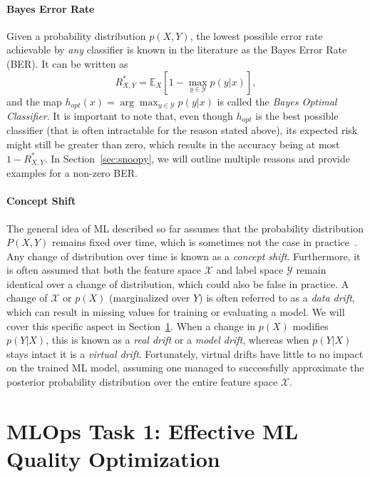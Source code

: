 \documentclass[11pt]{article}
\def \cX {\mathcal X}
\def \cY {\mathcal Y}
\begin{document}
\paragraph{Bayes Error Rate}
Given a probability distribution $p(X,Y)$, the lowest possible error rate achievable by \textit{any} classifier is known in the literature as the Bayes Error Rate (BER). It can be written as
\begin{equation}
\label{eq:bayes_error}
R_{X,Y}^* = \mathbb{E}_{X} \left[ 1- \max_{y\in\cY} p(y| x) \right],
\end{equation}
and the map $h_{opt}(x)=\arg \max_{y\in\cY} p(y \vert x)$ is called the \textit{Bayes Optimal Classifier}. It is important to note that, even though $h_{opt}$ is the best possible classifier (that is often intractable for the reason stated above), its expected risk might still be greater than zero, which results in the accuracy being at most $1 - R_{X,Y}^*$. In Section~\ref{sec:snoopy}, we will outline multiple reasons and provide examples for a non-zero BER.

\paragraph{Concept Shift}

The general idea of ML described so far assumes that the probability distribution $P(X, Y)$ remains fixed over time, which is sometimes not the case in practice~\cite{widmer1996learning, tsymbal2004problem, gama2014survey}. Any change of distribution over time is known as a \textit{concept shift}.
Furthermore, it is often assumed that both the feature space $\cX$ and label space $\cY$ remain identical over a change of distribution, which could also be false in practice. A change of $\cX$ or $p(X)$ (marginalized over $Y$) is often referred to as a \textit{data drift}, which can result in missing values for training or evaluating a model. We will cover this specific aspect in Section~\ref{sec:cpclean}. When a change in $p(X)$ modifies $p(Y\vert X)$, this is known as a \textit{real drift} or a \textit{model drift}, whereas when $p(Y\vert X)$ stays intact it is a \textit{virtual drift}. Fortunately, virtual drifts have little to no impact on the trained ML model, assuming one managed to successfully approximate the posterior probability distribution over the entire feature space $\cX$.

\section{MLOps Task 1: Effective ML Quality Optimization}
\label{sec:cpclean}
\end{document}
